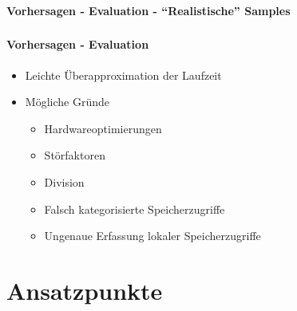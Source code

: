 \documentclass{beamer}
\begin{document}
\begin{frame}
	\frametitle{}
	\framesubtitle{Vorhersagen - Evaluation - ``Realistische'' Samples}
	\begin{center}
    	\end{center}
\end{frame}

\begin{frame}
	\frametitle{}
	\framesubtitle{Vorhersagen - Evaluation}
	\begin{itemize}
		\item Leichte Überapproximation der Laufzeit
		\item Mögliche Gründe
		\begin{itemize}
			\item Hardwareoptimierungen
			\item Störfaktoren
			\item Division
			\item Falsch kategorisierte Speicherzugriffe
			\item Ungenaue Erfassung lokaler Speicherzugriffe
		\end{itemize}
	\end{itemize}
\end{frame}

\section{Ansatzpunkte}
\label{sect:further}
\end{document}
